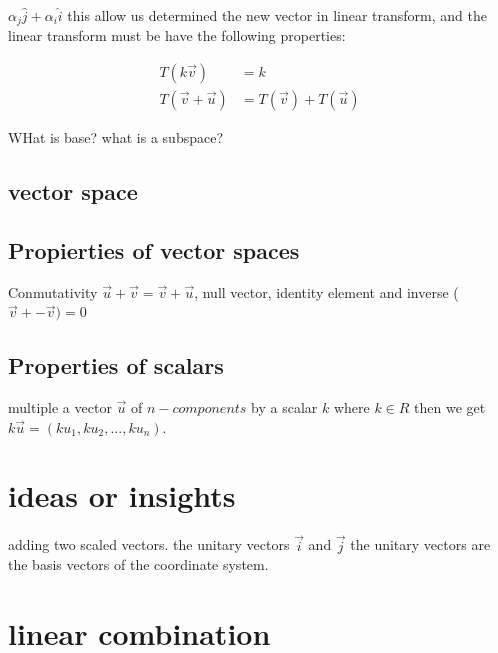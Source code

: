 \documentclass[10pt,a4paper]{article}
\begin{document}
$\alpha_{j} \hat{j} + \alpha_{i} \hat{i}$ this allow us determined the new vector in linear transform, and the linear transform must be 
have the following properties:

\begin{equation}
\begin{align*}
T(k\vec{v}) &= k \\
T(\vec{v} + \vec{u} ) &= T(\vec{v}) + T(\vec{u})
\end{align*}
\end{equation}

WHat is base?
what is a subspace?



\subsection{vector space}



\subsection{Propierties of vector spaces}

Conmutativity $\vec{u} + \vec{v} = \vec{v} + \vec{u}$, null vector, identity element and inverse ( $\vec{v} + -\vec{v} )  = 0$

\subsection{Properties of scalars}

multiple a vector $\vec{u}$ of $n-components$ by a scalar $k$  where $k \in R $ then we get $k\vec{u} = (ku_{1}, ku_{2},...,ku_{n})$.




\section{ideas or insights}
adding two scaled vectors.
the unitary vectors $\vec{i}$ and $\vec{j}$ the unitary vectors are the basis vectors of the coordinate system.


\section{linear combination}
\end{document}
